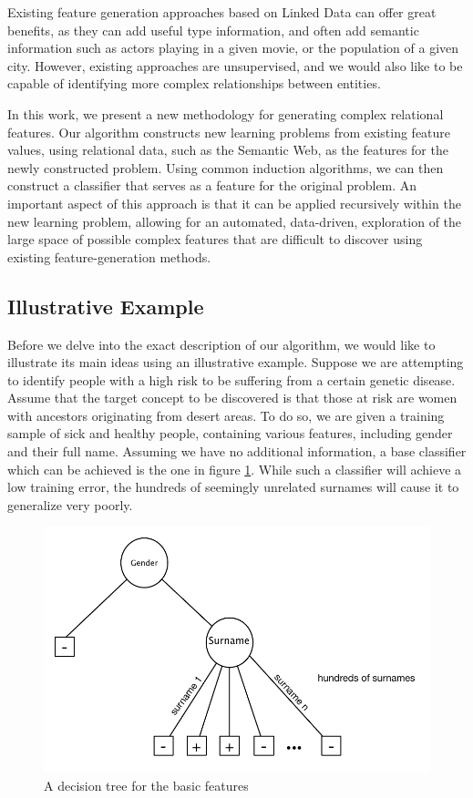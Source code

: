 \documentclass[twoside,11pt]{article}
\theoremstyle{definition}
\begin{document}
Existing feature generation approaches based on Linked Data can offer great benefits, as they can add useful type information, and often add semantic information such as actors playing in a given movie, or the population of a given city.
However, existing approaches are unsupervised, and we would also like to be capable of identifying more complex relationships between entities.

In this work, we present a new methodology for generating complex relational features.  Our algorithm constructs new learning problems from existing feature values, using relational data, such as the Semantic Web, as the features for the newly constructed problem.
Using common induction algorithms, we can then construct a classifier that serves as a feature for the original problem. An important aspect of this approach is that it can be applied recursively within the new learning problem, allowing for an automated, data-driven, exploration of the large space of possible  complex features that are difficult to discover using existing feature-generation methods.

\subsection{Illustrative Example} %

Before we delve into the exact description of our algorithm, we would like to illustrate its main ideas using an illustrative example.
Suppose we are attempting to identify people with a high risk to be suffering from a certain genetic disease. Assume that the target concept to be discovered is that those at risk are women with ancestors originating from desert areas. To do so, we are given a training sample of sick and healthy people, containing various features, including gender and their full name.
Assuming we have no additional information, a base classifier which can be achieved is the one in figure \ref{fig:tree_base}. While such a classifier will achieve a low training error, the hundreds of seemingly unrelated surnames will cause it to generalize very poorly.

\begin{figure}
	\centering
	\includegraphics[width=\linewidth]{fig1.pdf}
	\caption{A decision tree for the basic features}
	\label{fig:tree_base}
\end{figure}
\end{document}
